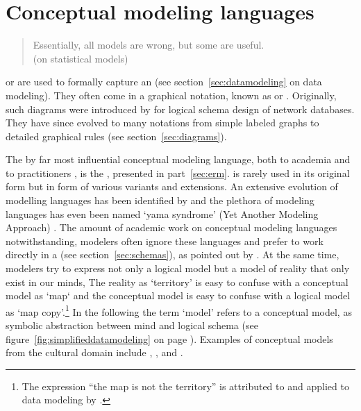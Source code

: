 \section{Conceptual modeling languages}
\label{sec:modelangs}

\begin{quotation}%
Essentially, all models are wrong, but some are useful.\\
\quotationsource {} (on statistical models)
\end{quotation}


\noindent {} \cite{Frederiks1997} or
 \cite{Hull1987,Peckham1988} are used to
formally capture an  (see
section~\ref{sec:datamodeling} on data modeling).  They often come in a
graphical notation, known as  or . Originally, such diagrams were introduced by \textcite{Bachman1969}
for logical schema design of network databases. They have since evolved to
many notations from simple labeled graphs to detailed graphical rules (see
section~\ref{sec:diagrams}).

The by far most influential conceptual modeling language, both to academia
\cite{Chen2007} and to practitioners \cite{Simsion2007},  is the
, presented in part~\ref{sec:erm}.
 is rarely used in its original form but in form of various variants
and extensions. An extensive evolution of modelling languages has been
identified by \cite{Patig2006} and the plethora of modeling languages has even
been named `yama syndrome' (Yet Another Modeling Approach) \textcite{Oei1992}.
The amount of academic work on conceptual modeling languages notwithstanding,
modelers often ignore these languages and prefer to work directly in a
 (see section~\ref{sec:schemas}), as pointed
out by \textcite[p.  345]{Simsion2007}.  At the same time, modelers try to
express not only a logical model but a model of reality that only exist in our
minds, The reality as `territory' is easy to confuse with a conceptual model as
`map` and the conceptual model is easy to confuse with a logical model as `map
copy'.\footnote{The expression ``the map is not the territory'' is attributed
to \textcite{Korzybski1933} and applied to data modeling by \cite{Kent1978}.}
In the following the term `model' refers to a conceptual model, as symbolic
abstraction between mind and logical schema (see
figure~\ref{fig:simplifieddatamodeling} on page
\pageref{fig:simplifieddatamodeling}). Examples of conceptual models from the
cultural domain include  \cite{FRBR1998}, 
\cite{Crofts2011}, and  \cite{GonzalezPerez2012}.

